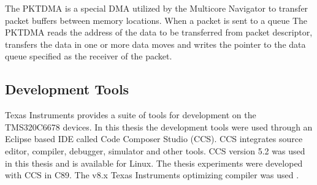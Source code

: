 The PKTDMA is a special DMA utilized by the Multicore Navigator to transfer packet buffers between memory locations. When a packet is sent to a queue The PKTDMA reads the address of the data to be transferred from packet descriptor, transfers the data in one or more data moves and writes the pointer to the data queue specified as the receiver of the packet. \cite{navigator} 

\subsection{Development Tools}
\label{subsec:devtools}

Texas Instruments provides a suite of tools for development on the TMS320C6678 devices. In this thesis the development tools were used through an Eclipse based IDE called Code Composer Studio (CCS). CCS integrates source editor, compiler, debugger, simulator and other tools. CCS version 5.2 was used in this thesis and is available for Linux. \cite{ccspage} The thesis experiments were developed with CCS in C89. The v8.x Texas Instruments optimizing compiler was used \cite{compilerguide}.
